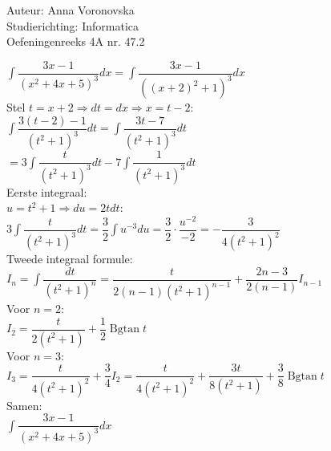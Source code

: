 \documentclass[a4paper]{article}
\begin{document}
  
\noindent \large Auteur: Anna Voronovska \\
\noindent \large Studierichting: Informatica\\
\noindent \large Oefeningenreeks 4A nr. 47.2\\

\medskip

\normalsize



$\displaystyle\int \dfrac{3x-1}{(x^2+4x+5)^3}dx = \displaystyle\int \dfrac{3x-1}{((x+2)^2 + 1)^3}dx$\\

Stel $t = x+2 \Rightarrow dt = dx \Rightarrow x = t-2$:\\

$\displaystyle\int \dfrac{3(t-2)-1}{(t^2+1)^3}dt = \displaystyle\int \dfrac{3t-7}{(t^2+1)^3}dt$\\

$= 3\displaystyle\int \dfrac{t}{(t^2+1)^3}dt - 7\displaystyle\int \dfrac{1}{(t^2+1)^3}dt$\\

Eerste integraal:\\

$u = t^2+1 \Rightarrow du = 2tdt$:\\

$3\displaystyle\int \dfrac{t}{(t^2+1)^3}dt = \dfrac{3}{2}\displaystyle\int u^{-3}du = \dfrac{3}{2} \cdot \dfrac{u^{-2}}{-2} = -\dfrac{3}{4(t^2+1)^2}$\\

Tweede integraal formule:\\

$I_n = \displaystyle\int \dfrac{dt}{(t^2+1)^n} = \dfrac{t}{2(n-1)(t^2+1)^{n-1}} + \dfrac{2n-3}{2(n-1)} I_{n-1}$\\

Voor $n=2$:\\

$I_2 = \dfrac{t}{2(t^2+1)} + \dfrac{1}{2}\operatorname{Bgtan} t$\\

Voor $n=3$:\\

$I_3 = \dfrac{t}{4(t^2+1)^2} + \dfrac{3}{4}I_2 = \dfrac{t}{4(t^2+1)^2} + \dfrac{3t}{8(t^2+1)} + \dfrac{3}{8}\operatorname{Bgtan}t$\\

Samen:\\

$\displaystyle\int \dfrac{3x-1}{(x^2+4x+5)^3}dx $\\
\end{document}
